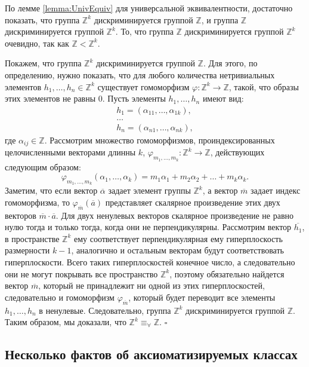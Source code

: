 \documentclass[a4paper,11pt,twoside]{article}
\def\proof{{\noindent{\bf Доказательство.}} }
\def\Z{{\mathbb{Z}}}
\begin{document}
\proof По лемме \ref{lemma:UnivEquiv} для универсальной эквивалентности, достаточно показать, что группа $\Z^k$ дискриминируется группой $\Z$, и группа $\Z$ дискриминируется группой $\Z^k$. То, что группа $\Z$ дискриминируется группой $\Z^k$ очевидно, так как $\Z < \Z^k$. 

Покажем, что группа $\Z^k$ дискриминируется группой $\Z$. Для этого, по определению, нужно показать, что для любого количества нетривиальных элементов $h_1, \ldots, h_n \in \Z^k$ существует гомоморфизм $\varphi : \Z^k \rightarrow \Z$, такой, что образы этих элементов не равны 0. Пусть элементы $h_1, \ldots, h_n$ имеют вид:
$$\begin{array}{c}
 h_1 = (\alpha_{11}, \ldots, \alpha_{1k}), \\
 \ldots \\
 h_n = (\alpha_{n1}, \ldots, \alpha_{nk}),
 \end{array} $$
где $\alpha_{ij} \in \Z$. Рассмотрим множество гомоморфизмов, проиндексированных целочисленными векторами длинны $k$, $\varphi_{m_1,\ldots,m_k} : \Z^k \rightarrow \Z$, действующих следующим образом:
$$\varphi_{m_1,\ldots,m_k} (\alpha_1, \ldots, \alpha_k) = m_1 \alpha_1 + m_2 \alpha_2 + \ldots + m_k \alpha_k.$$
Заметим, что если вектор $\overline{\alpha}$ задает элемент группы $\Z^k$, а вектор $\overline{m}$ задает индекс гомоморфизма, то $\varphi_{\overline{m}}(\overline{a})$ представляет скалярное произведение этих двух векторов $\overline{m} \cdot \overline{a}$. Для двух ненулевых векторов скалярное произведение не равно нулю тогда и только тогда, когда они не перпендикулярны. Рассмотрим вектор $\overline{h_1}$, в пространстве $\Z^k$ ему соответствует перпендикулярная ему гиперплоскость размерности $k-1$, аналогично и остальным векторам будут соответствовать гиперплоскости. Всего таких гиперплоскостей конечное число, а следовательно они не могут покрывать все пространство $\Z^k$, поэтому обязательно найдется вектор $\overline{m}$, который не принадлежит ни одной из этих гиперплоскостей, следовательно и гомоморфизм $\varphi_{\overline{m}}$, который будет переводит все элементы $h_1,\ldots, h_n$ в ненулевые. Следовательно, группа $\Z^k$ дискриминируется группой $\Z$. Таким образом, мы доказали, что $\Z^k \equiv_{\forall} \Z$. $\square$



\subsection{Несколько фактов об аксиоматизируемых классах}
\end{document}
